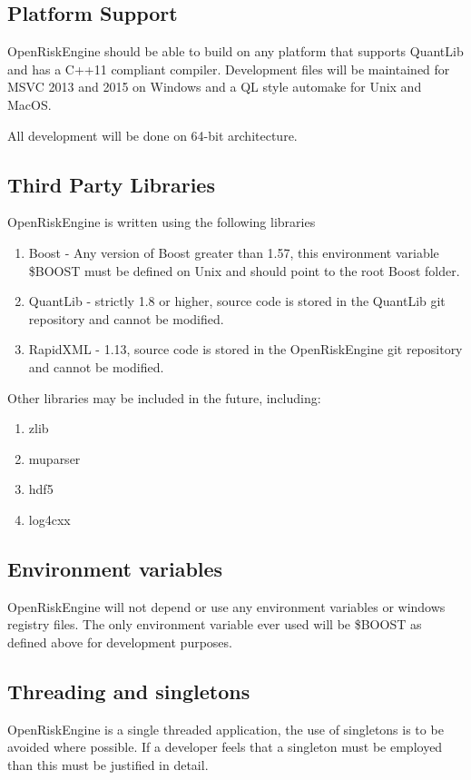 \documentclass[12pt, a4paper]{article}
\begin{document}
\subsection*{Platform Support}
OpenRiskEngine should be able to build on any platform that supports QuantLib and has a C++11 compliant compiler. Development files will be maintained for MSVC 2013 and 2015 on Windows and a QL style automake for Unix and MacOS.

All development will be done on 64-bit architecture.

\subsection*{Third Party Libraries}
OpenRiskEngine is written using the following libraries
\begin{enumerate}
\item Boost - Any version of Boost greater than 1.57, this environment variable \$BOOST must be defined on Unix and should point to the root Boost folder.
\item QuantLib - strictly 1.8 or higher, source code is stored in the QuantLib git repository and cannot be modified.
\item RapidXML - 1.13, source code is stored in the OpenRiskEngine git repository and cannot be modified.
\end{enumerate}
Other libraries may be included in the future, including:
\begin{enumerate}
\item zlib
\item muparser
\item hdf5
\item log4cxx
\end{enumerate}

\subsection*{Environment variables}
OpenRiskEngine will not depend or use any environment variables or windows registry files. The only environment variable ever used will be \$BOOST as defined above for development purposes.

\subsection*{Threading and singletons}
OpenRiskEngine is a single threaded application, the use of singletons is to be avoided where possible. If a developer feels that a singleton must be employed than this must be justified in detail.
\end{document}
